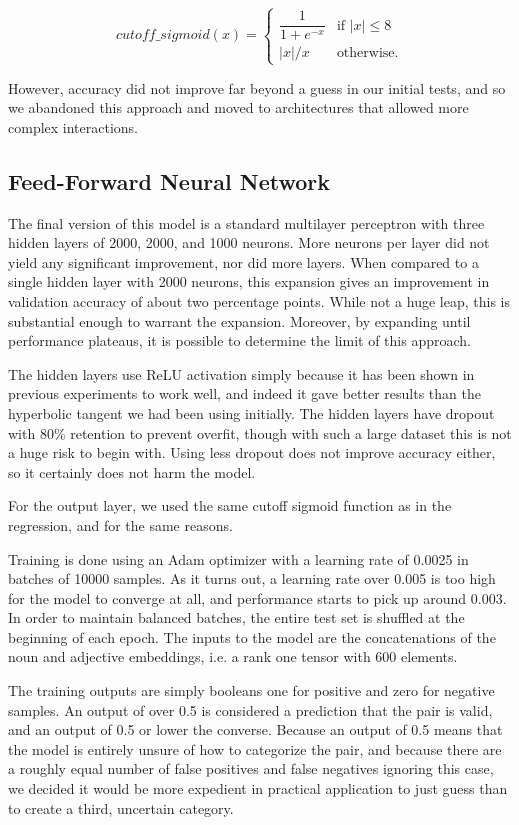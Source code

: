 \documentclass[a4paper, 12pt]{article}
\begin{document}
\begin{equation} \label{eq:5}
	cutoff\_sigmoid(x) =
	\begin{cases}
		\dfrac{1}{1 + e^{-x}} & \text{if } |x| \leq 8 \\
		|x| / x               & \text{otherwise.}
	\end{cases}
\end{equation}

However, accuracy did not improve far beyond a guess in our initial tests, and so we abandoned this approach and moved to architectures that allowed more complex interactions.

\subsection{Feed-Forward Neural Network}
The final version of this model is a standard multilayer perceptron with three hidden layers of 2000, 2000, and 1000 neurons. More neurons per layer did not yield any significant improvement, nor did more layers. When compared to a single hidden layer with 2000 neurons, this expansion gives an improvement in validation accuracy of about two percentage points. While not a huge leap, this is substantial enough to warrant the expansion. Moreover, by expanding until performance plateaus, it is possible to determine the limit of this approach.

The hidden layers use ReLU activation simply because it has been shown in previous experiments to work well, and indeed it gave better results than the hyperbolic tangent we had been using initially. The hidden layers have dropout with 80\% retention to prevent overfit, though with such a large dataset this is not a huge risk to begin with. Using less dropout does not improve accuracy either, so it certainly does not harm the model.

For the output layer, we used the same cutoff sigmoid function as in the regression, and for the same reasons.

Training is done using an Adam optimizer with a learning rate of 0.0025 in batches of 10000 samples. As it turns out, a learning rate over 0.005 is too high for the model to converge at all, and performance starts to pick up around 0.003. In order to maintain balanced batches, the entire test set is shuffled at the beginning of each epoch. The inputs to the model are the concatenations of the noun and adjective embeddings, i.e. a rank one tensor with 600 elements.

The training outputs are simply booleans \textemdash one for positive and zero for negative samples. An output of over 0.5 is considered a prediction that the pair is valid, and an output of 0.5 or lower the converse. Because an output of 0.5 means that the model is entirely unsure of how to categorize the pair, and because there are a roughly equal number of false positives and false negatives ignoring this case, we decided it would be more expedient in practical application to just guess than to create a third, uncertain category.
\end{document}
